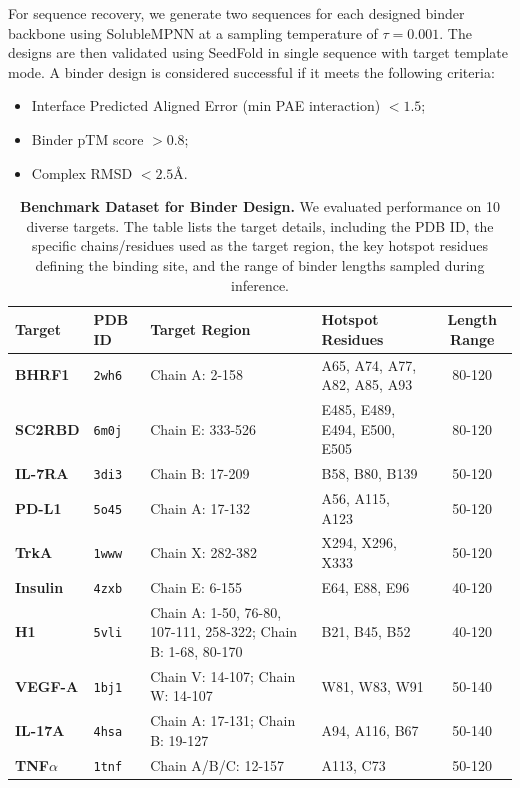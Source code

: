 \documentclass[]{bytedance_seed}
\begin{document}
For sequence recovery, we generate two sequences for each designed binder backbone using SolubleMPNN at a sampling temperature of $\tau = 0.001$. The designs are then validated using SeedFold in single sequence with target template mode. A binder design is considered successful if it meets the following criteria:
\begin{itemize}
    \item Interface Predicted Aligned Error (min PAE interaction) $< 1.5$;
    \item Binder pTM score $> 0.8$;
    \item Complex RMSD $< 2.5$\AA.
\end{itemize}


\begin{table}[t]
\centering
\caption{\textbf{Benchmark Dataset for Binder Design.} 
We evaluated performance on 10 diverse targets. The table lists the target details, including the PDB ID, the specific chains/residues used as the target region, the key hotspot residues defining the binding site, and the range of binder lengths sampled during inference.}
\label{tab:targets}
\small 
\begin{tabularx}{\textwidth}{l l >{\raggedright\arraybackslash}X >{\raggedright\arraybackslash}X c}
\toprule
\textbf{Target} & \textbf{PDB ID} & \textbf{Target Region} & \textbf{Hotspot Residues} & \textbf{Length Range} \\
\midrule
\textbf{BHRF1}      & \texttt{2wh6} & Chain A: 2-158 & A65, A74, A77, A82, A85, A93 & 80-120 \\
\textbf{SC2RBD}     & \texttt{6m0j} & Chain E: 333-526 & E485, E489, E494, E500, E505 & 80-120 \\
\textbf{IL-7RA}     & \texttt{3di3} & Chain B: 17-209 & B58, B80, B139 & 50-120 \\
\textbf{PD-L1}      & \texttt{5o45} & Chain A: 17-132 & A56, A115, A123 & 50-120 \\
\textbf{TrkA}       & \texttt{1www} & Chain X: 282-382 & X294, X296, X333 & 50-120 \\
\textbf{Insulin}    & \texttt{4zxb} & Chain E: 6-155 & E64, E88, E96 & 40-120 \\
\textbf{H1}         & \texttt{5vli} & Chain A: 1-50, 76-80, 107-111, 258-322; Chain B: 1-68, 80-170 & B21, B45, B52 & 40-120 \\
\textbf{VEGF-A}     & \texttt{1bj1} & Chain V: 14-107; Chain W: 14-107 & W81, W83, W91 & 50-140 \\
\textbf{IL-17A}     & \texttt{4hsa} & Chain A: 17-131; Chain B: 19-127 & A94, A116, B67 & 50-140 \\
\textbf{TNF$\alpha$}& \texttt{1tnf} & Chain A/B/C: 12-157 & A113, C73 & 50-120 \\
\bottomrule
\end{tabularx}
\end{table}
\end{document}
